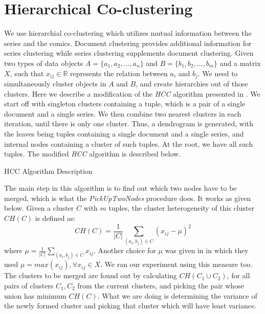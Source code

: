 \documentclass[11pt]{article}
\begin{document}
\section{Hierarchical Co-clustering}
We use hierarchial co-clustering which utilizes mutual information between the series and the comics. Document clustering provides additional information for series clustering while series clustering supplements document clustering.
Given two types of data objects $A=\{a_1,a_2,\ldots,a_n\}$ and $B=\{b_1,b_2,\ldots,b_m\}$ and a matrix $X$, such that $x_{ij} \in \mathbb{R}$ represents the relation between $a_i$ and $b_j$. We need to simultaneously cluster objects in $A$ and $B$, and create hierarchies out of those clusters.
Here we describe a modification of the \emph{HCC} algorithm presented in \cite{HCC1}.
We start off with singleton clusters containing a tuple, which is a pair of a single document and a single series. We then combine two nearest clusters in each iteration, until there is only one cluster. Thus, a dendrogram is generated, with the leaves being tuples containing a single document and a single series, and internal nodes containing a cluster of such tuples. At the root, we have all such tuples.
The modified \emph{HCC} algorithm is described below.
\begin{algorithm}[H]
  \caption{HCC Algorithm Description}
  \label{hcc_algo}
  \begin{algorithmic}
    \ENDFOR
  \end{algorithmic}
\end{algorithm}
The main step in this algorithm is to find out which two nodes have to be merged, which is what the \emph{PickUpTwoNodes} procedure does. It works as given below.
Given a cluster $C$ with $m$ tuples, the cluster heterogeneity of this cluster $CH(C)$ is defined as:
\begin{displaymath}
  CH(C)=\frac{1}{|C|}\sum_{(a_i,b_j) \in C}(x_{ij}-\mu)^2
\end{displaymath}
where $\mu=\frac{1}{|C|}\sum_{(a_i,b_j) \in C}x_{ij}$.
Another choice for $\mu$ was given in \cite{HCC2} in which they used $\mu=max(x_{ij}), \forall x_{ij} \in X$. We ran our experiment using this measure too.\\
The clusters to be merged are found out by calculating $CH(C_1 \cup C_2)$, for all pairs of clusters $C_1,C_2$ from the current clusters, and picking the pair whose union has minimum $CH(C)$. What we are doing is determining the variance of the newly formed cluster and picking that cluster which will have least variance.\\
\end{document}
